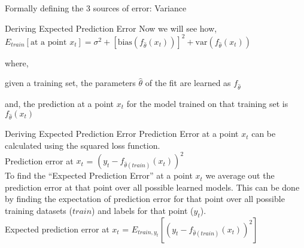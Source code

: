 \documentclass{beamer}
\begin{document}
\begin{frame}{Formally defining the 3 sources of error: Variance}

\end{frame}

\begin{frame}{Deriving Expected Prediction Error}
Now we will see how, 
$ E_{train}[\text{at a point } x_t] = \sigma^2 + [\text{bias}(f_{\hat{\theta}}(x_t))]^2 + \text{var}(f_{\hat{\theta}}(x_t)) $

where, 

given a training set, the parameters $\hat{\theta}$ of the fit are learned as $f_{\hat{\theta}}$ 

and, the prediction at a point $x_t$ for the model trained on that training set is $f_{\hat{\theta}}(x_t)$
\end{frame}

\begin{frame}{Deriving Expected Prediction Error}
Prediction Error at a point $x_t$ can be calculated using the squared loss function.\\
\vspace{0.5cm}
 Prediction error at $x_t$ = $(y_t - f_{\hat\theta(train)}(x_t))^2$\\
\vspace{0.5cm}
To find the ``Expected Prediction Error'' at a point $x_t$ we average out the prediction error at that point over all possible learned models. This can be done by finding the expectation of prediction error for that point over all possible training datasets ($train$) and labels for that point ($y_t$).  \\
\vspace{0.5cm}
Expected prediction error at $x_t$ = $E_{train,y_t}[(y_t - f_{\hat\theta(train)}(x_t))^2]$\\
\end{frame}
\end{document}
